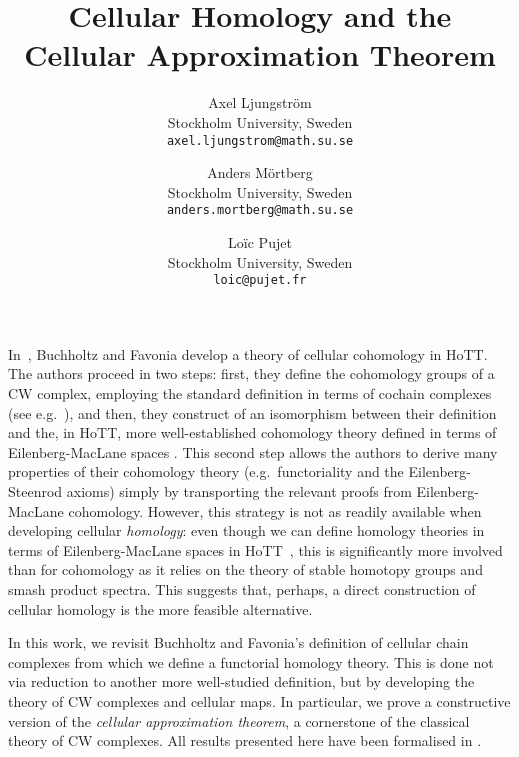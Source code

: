 \documentclass[a4page]{article}
\title{Cellular Homology and the Cellular Approximation Theorem}
\author{
  Axel Ljungström\\
  \footnotesize{Stockholm University, Sweden}\\
  \footnotesize{\texttt{axel.ljungstrom@math.su.se}}
  \and
  Anders Mörtberg\\
  \footnotesize{Stockholm University, Sweden}\\
  \footnotesize{\texttt{anders.mortberg@math.su.se}}
  \and
  Loïc Pujet\\
  \footnotesize{Stockholm University, Sweden}\\
  \footnotesize{\texttt{loic@pujet.fr}}
}
\date{}
\begin{document}
\maketitle
\vspace{-.5cm}
%
In~\cite{BuchholtzFavonia18}, Buchholtz and Favonia develop a theory
of cellular cohomology in HoTT. The authors proceed in two steps:
%
first, they define the cohomology groups of a CW complex, employing the
standard definition in terms of cochain complexes (see e.g.\ \cite{May1999}),
and then, they construct of an isomorphism between their definition and
the, in HoTT, more well-established cohomology theory defined in terms of Eilenberg-MacLane
spaces \cite{ShulmanBlog13,LicataFinster14,CavalloMsc15}.
%
This second step allows the authors to derive many properties of their
cohomology theory (e.g.\ functoriality and the Eilenberg-Steenrod axioms)
simply by transporting the relevant proofs from Eilenberg-MacLane cohomology.
%
However, this strategy is not as readily available when developing cellular \emph{homology}:
%
even though we can define homology theories in terms of Eilenberg-MacLane spaces in HoTT~\cite{graham18,christensen2020hurewicz,FlorisPhd,spectralsequences}, this is significantly more involved than for cohomology
as it relies on the theory of stable homotopy groups and smash product spectra. This suggests that, perhaps, a direct construction of cellular homology is the more feasible alternative.

In this work, we revisit Buchholtz and Favonia's
definition of cellular chain complexes from which we define a functorial homology theory. This is done not via reduction to another more
well-studied definition, but by developing the theory of CW complexes and
cellular maps.
%
In particular, we prove a constructive version of the \emph{cellular
  approximation theorem}, a cornerstone of the classical theory of CW complexes. All results presented here have been formalised in \CubicalAgda \cite{cubicalagda2}.

\end{document}
